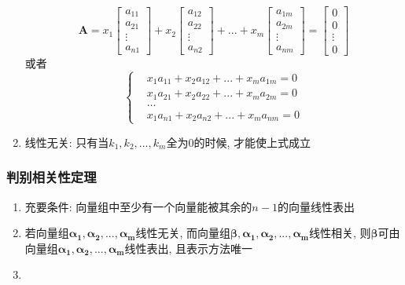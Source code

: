 \begin{enumerate}
\begin{equation*}
    \bm{A}=x_{1}\begin{bmatrix}
    	a_{11} \\
    	a_{21} \\
    	\vdots \\
    	a_{n1}
    \end{bmatrix}+
    x_{2}\begin{bmatrix}
    	a_{12} \\
    	a_{22} \\
    	\vdots \\
    	a_{n2}
    \end{bmatrix}+...+
    x_{m}\begin{bmatrix}
    	a_{1m} \\
    	a_{2m} \\
    	\vdots \\
    	a_{nm}
    \end{bmatrix}=
\begin{bmatrix}
	0 \\
	0 \\
	\vdots \\
	0
\end{bmatrix}
    \end{equation*}
或者
\begin{equation*}
	\left\{\begin{aligned}
		& x_{1}a_{11}+x_{2}a_{12}+...+x_{m}a_{1m}=0 \\
		& x_{1}a_{21}+x_{2}a_{22}+...+x_{m}a_{2m}=0 \\
		& \dots \\
		& x_{1}a_{n1}+x_{2}a_{n2}+...+x_{m}a_{nm}=0
	\end{aligned}
    \right.
\end{equation*}
    \item 线性无关: 只有当$ k_{1},k_{2},...,k_{m} $全为$ 0 $的时候, 才能使上式成立
\end{enumerate}
\subsubsection{判别相关性定理}
\begin{enumerate}
	\item 充要条件: 向量组中至少有一个向量能被其余的$ n-1 $的向量线性表出
	\item 若向量组$ \bm{\alpha_{1}},\bm{\alpha_{2}},...,\bm{\alpha_{m}} $线性无关, 而向量组$ \bm{\beta}, \bm{\alpha_{1}},\bm{\alpha_{2}},...,\bm{\alpha_{m}} $线性相关, 则$ \bm{\beta} $可由向量组$ \bm{\alpha_{1}},\bm{\alpha_{2}},...,\bm{\alpha_{m}} $线性表出, 且表示方法唯一
	\item 
\end{enumerate}


